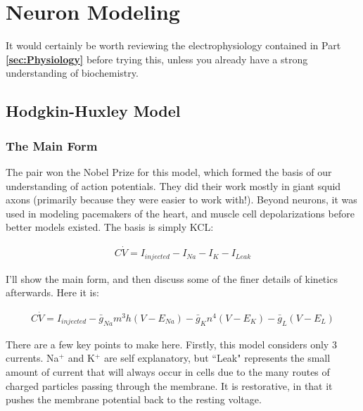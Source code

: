 \chapter{Neuron Modeling}

It would certainly be worth reviewing the electrophysiology contained in Part \textbf{\ref{sec:Physiology}} before trying this, unless you already have a strong understanding of biochemistry.  


\section{Hodgkin-Huxley Model} 

\subsection{The Main Form} The pair won the Nobel Prize for this model, which formed the basis of our understanding of action potentials. They did their work mostly in giant squid axons (primarily because they were easier to work with!). Beyond neurons, it was used in modeling pacemakers of the heart, and muscle cell depolarizations before better models existed.  The basis is simply KCL: 

\bigskip

\begin{equation} \label{hh1}
\begin{split}
C\dot{V} = I_{injected} - I_{Na} - I_{K} - I_{Leak}
\end{split}
\end{equation}

\bigskip

I'll show the main form, and then discuss some of the finer details of kinetics afterwards. Here it is: 

\bigskip

\begin{equation} \label{hh2}
\begin{split}
C\dot{V} = I_{injected} - \bar{g}_{Na}m^3h(V - E_{Na}) - \bar{g}_{K}n^4(V - E_{K}) - \bar{g}_{L}(V - E_{L})
\end{split}
\end{equation}

\bigskip 

There are a few key points to make here. Firstly, this model considers only 3 currents. Na$^+$ and K$^+$ are self explanatory, but ``Leak" represents the small amount of current that will always occur in cells due to the many routes of charged particles passing through the membrane. It is restorative, in that it pushes the membrane potential back to the resting voltage.


